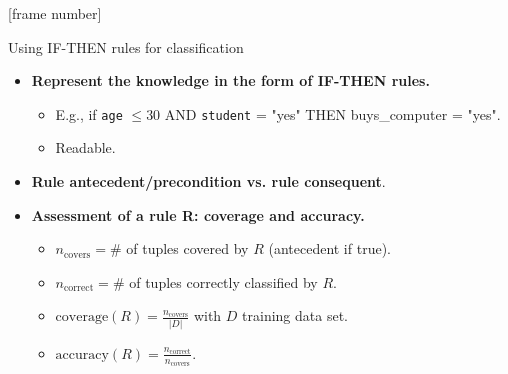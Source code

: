 \documentclass[aspectratio=169,t,table]{beamer}
\begin{document}
  {
    [frame number]
    \begin{frame}{Using \uppercase{if-then} rules for classification}
      \begin{itemize}
        \item \textbf{Represent the knowledge in the form of {\color{airforceblue}IF-THEN rules}.}
        \begin{itemize}
          \item E.g., if \texttt{age} $\leq 30$ AND \texttt{student} = "yes" THEN buys\_computer = "yes".
          \item Readable.
        \end{itemize}
        \item \textbf{Rule {\color{airforceblue}antecedent/precondition} vs. rule {\color{airforceblue}consequent}}.
        \item \textbf{Assessment of a rule R: coverage and accuracy.}
        \begin{itemize}
          \item $n_{\text{covers}} = \#$ of tuples covered by $R$ (antecedent if true).
          \item $n_{\text{correct}} = \#$ of tuples correctly classified by $R$.
          \item $\text{coverage}(R) = \frac{n_{\text{covers}}}{|D|}$ with $D$ training data set.
          \item $\text{accuracy}(R) = \frac{n_{\text{correct}}}{n_{\text{covers}}}$.
        \end{itemize}
      \end{itemize}
    \end{frame}
  }
\end{document}
